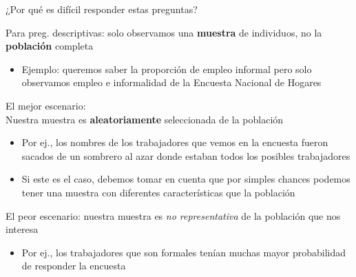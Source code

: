 \documentclass[11pt,handout,aspectratio=169]{beamer}
\newenvironment{wideitemize}{\itemize\addtolength{\itemsep}{10pt}}{\enditemize}
\begin{document}
\begin{frame}{¿Por qué es difícil responder estas preguntas?}

\begin{wideitemize}
\item
Para preg. descriptivas: solo observamos una \textbf{muestra} de individuos, no la \textbf{población} completa
	\begin{itemize}
		\item 
		Ejemplo: queremos saber la proporción de empleo informal pero solo observamos empleo e informalidad de la Encuesta Nacional de Hogares
	\end{itemize}
\pause

\item El mejor escenario: \\Nuestra muestra es \textbf{aleatoriamente} seleccionada de la población \\
	\begin{itemize}
		\item 
		Por ej., los nombres de los trabajadores que vemos en la encuesta fueron sacados de un sombrero al azar donde estaban todos los posibles trabajadores
		
		\item
		Si este es el caso, debemos tomar en cuenta que por simples chances podemos tener una muestra con diferentes características que la población
	\end{itemize}


\pause
\item El peor escenario: nuestra muestra es \textit{no representativa} de la población que nos interesa
	\begin{itemize}
		\item 
		Por ej., los trabajadores que son formales tenían muchas mayor probabilidad de responder la encuesta 
	\end{itemize}
\end{wideitemize}

\end{frame}
\end{document}
